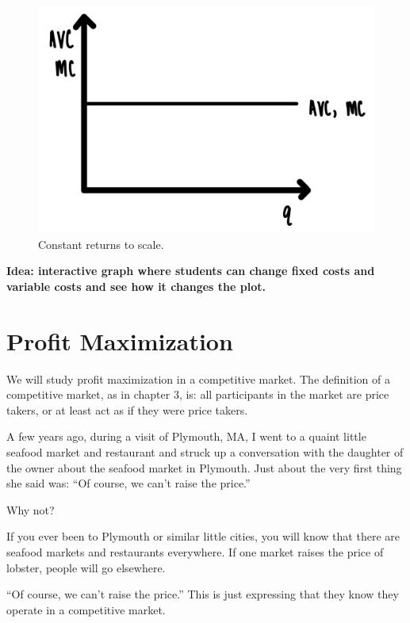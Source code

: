 \documentclass[
]{book}
\begin{document}
\begin{figure}

{\centering \includegraphics[width=0.75\linewidth]{img/ch4/fig4} 

}

\caption{Constant returns to scale.}\label{fig:fig404}
\end{figure}

\begin{addition}
\textbf{Idea: interactive graph where students can change fixed costs and variable costs and see how it changes the plot.}

\end{addition}

\hypertarget{profit-maximization}{%
\section{Profit Maximization}\label{profit-maximization}}

We will study profit maximization in a competitive market. The definition of a competitive market, as in chapter 3, is: all participants in the market are price takers, or at least act as if they were price takers.

A few years ago, during a visit of Plymouth, MA, I went to a quaint little seafood market and restaurant and struck up a conversation with the daughter of the owner about the seafood market in Plymouth. Just about the very first thing she said was: ``Of course, we can't raise the price.''

Why not?

If you ever been to Plymouth or similar little cities, you will know that there are seafood markets and restaurants everywhere. If one market raises the price of lobster, people will go elsewhere.

``Of course, we can't raise the price.'' This is just expressing that they know they operate in a competitive market.
\end{document}

